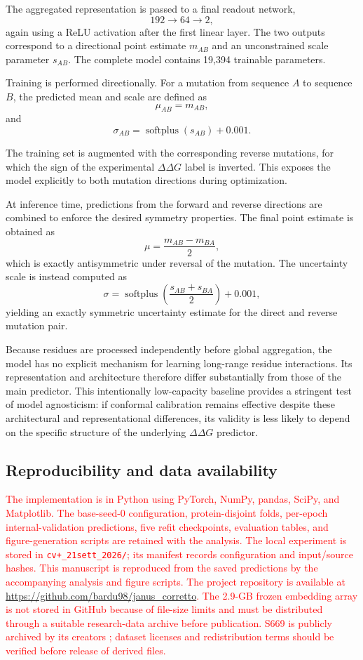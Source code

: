 \documentclass[11pt]{article}
\begin{document}
The aggregated representation is passed to a final readout network,
\[
192 \rightarrow 64 \rightarrow 2,
\]
again using a ReLU activation after the first linear layer. The two outputs correspond to a directional point estimate $m_{AB}$ and an unconstrained scale parameter $s_{AB}$. The complete model contains 19,394 trainable parameters.

Training is performed directionally. For a mutation from sequence $A$ to sequence $B$, the predicted mean and scale are defined as
\[
\mu_{AB} = m_{AB},
\]
and
\[
\sigma_{AB}
=
\operatorname{softplus}(s_{AB}) + 0.001.
\]

The training set is augmented with the corresponding reverse mutations, for which the sign of the experimental $\Delta\Delta G$ label is inverted. This exposes the model explicitly to both mutation directions during optimization.

At inference time, predictions from the forward and reverse directions are combined to enforce the desired symmetry properties. The final point estimate is obtained as
\[
\mu
=
\frac{m_{AB}-m_{BA}}{2},
\]
which is exactly antisymmetric under reversal of the mutation. The uncertainty scale is instead computed as
\[
\sigma
=
\operatorname{softplus}
\left(
\frac{s_{AB}+s_{BA}}{2}
\right)
+0.001,
\]
yielding an exactly symmetric uncertainty estimate for the direct and reverse mutation pair.

Because residues are processed independently before global aggregation, the model has no explicit mechanism for learning long-range residue interactions. Its representation and architecture therefore differ substantially from those of the main predictor. This intentionally low-capacity baseline provides a stringent test of model agnosticism: if conformal calibration remains effective despite these architectural and representational differences, its validity is less likely to depend on the specific structure of the underlying $\Delta\Delta G$ predictor.

\subsection{Reproducibility and data availability}

\textcolor{red}{The implementation is in Python using PyTorch, NumPy, pandas, SciPy, and Matplotlib. The base-seed-0 configuration, protein-disjoint folds, per-epoch internal-validation predictions, five refit checkpoints, evaluation tables, and figure-generation scripts are retained with the analysis. The local experiment is stored in \texttt{cv+\_21sett\_2026/}; its manifest records configuration and input/source hashes. This manuscript is reproduced from the saved predictions by the accompanying analysis and figure scripts. The project repository is available at \url{https://github.com/bardu98/janus_corretto}. The 2.9-GB frozen embedding array is not stored in GitHub because of file-size limits and must be distributed through a suitable research-data archive before publication. S669 is publicly archived by its creators \citep{pancotti2022predicting}; dataset licenses and redistribution terms should be verified before release of derived files.}
\end{document}
